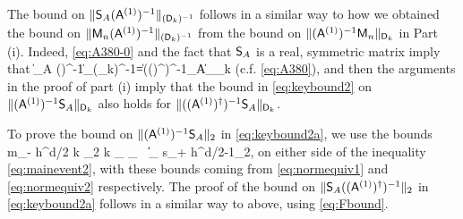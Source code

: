 The bound on $\|\mathsf{S}_A(\mathsf{A}^{(1)})^{-1}\|_{(\mathsf{D}_k)^{-1}}$ follows in a similar way to how we obtained the 
bound on  $\|\mathsf{M}_n(\mathsf{A}^{(1)})^{-1}\|_{(\mathsf{D}_k)^{-1}}$ from the bound on $\|(\mathsf{A}^{(1)})^{-1}\mathsf{M}_n\|_{\mathsf{D}_k}$ in Part (i). Indeed, 
\cref{eq:A380-0} and the fact that $\mathsf{S}_A$ is a real, symmetric matrix imply that 
\beq\label{eq:A380-2} 
 \big\|\Smat_A (\Amato)^{-1}\big\|_{(\Dmat_k)^{-1}}=\big\|\big((\Amato)^\dagger\big)^{-1}\Smat_A\big\|_{\Dmat_k}
 \eeq 
(c.f. \cref{eq:A380}),
and then the arguments in the proof of part (i) imply that 
the bound in \cref{eq:keybound2} on $\|(\mathsf{A}^{(1)})^{-1}\mathsf{S}_A\|_{\mathsf{D}_k}$ also holds for $\|((\mathsf{A}^{(1)})^\dagger)^{-1}\mathsf{S}_A\|_{\mathsf{D}_k}$.

To prove the bound on  $\|(\mathsf{A}^{(1)})^{-1}\mathsf{S}_A\|_{2}$ in \cref{eq:keybound2a}, we use the bounds 
\beqs
m_- h^{d/2} k \N{\tbu}_2 \leq k _{\LtD} \leq {}_{\HokD}
\,\tand\,
\big\|\nabla {}\big\|_{\LtD} \leq s_+ h^{d/2-1}\N{\fvec}_2,
\eeqs
on either side of the inequality \cref{eq:mainevent2}, with these bounds coming from \cref{eq:normequiv1} and \cref{eq:normequiv2} respectively. The proof of the bound on 
$\|\mathsf{S}_A((\mathsf{A}^{(1)})^\dagger)^{-1}\|_{2}$ in \cref{eq:keybound2a} follows in a similar way to above, using \cref{eq:Fbound}.
\epf


%

